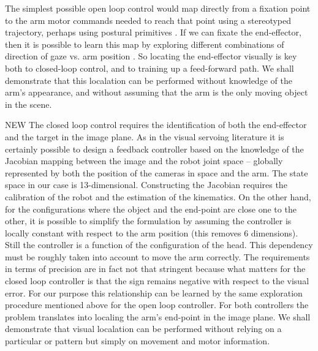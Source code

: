 The simplest possible open loop control would map directly from a
fixation point to the arm motor commands needed to reach that point
\cite{metta99developmental} using a stereotyped trajectory, perhaps
using postural primitives \cite{mussa-ivaldi92vector}.  If we can
fixate the end-effector, then it is possible to learn this map by
exploring different combinations of direction of gaze vs.  arm
position \cite{Marjanovic-96-SAB,metta99developmental}.  So locating
the end-effector visually is key both to closed-loop control, and to
training up a feed-forward path.  We shall demonstrate that this
local\iz{}ation can be performed without knowledge of the arm's appearance,
and without assuming that the arm is the only moving object in the
scene.

\ifverbose
NEW The closed loop control requires the identification of both the
end-effector and the target in the image plane. As in the visual
servoing literature \cite{espiau92new} it is certainly possible to
design a feedback controller based on the knowledge of the Jacobian
mapping between the image and the robot joint space -- globally
represented by both the position of the cameras in space and the arm.
The state space in our case is 13-dimensional. Constructing the
Jacobian requires the calibration of the robot and the estimation of
the kinematics.  On the other hand, for the configurations where the
object and the end-point are close one to the other, it is possible to
simplify the formulation by assuming the controller is locally
constant with respect to the arm position (this removes 6 dimensions).
Still the controller is a function of the configuration of the head.
This dependency must be roughly taken into account to move the arm
correctly. The requirements in terms of precision are in fact not that
stringent because what matters for the closed loop controller is that
the sign remains negative with respect to the visual error. For our
purpose this relationship can be learned by the same exploration
procedure mentioned above for the open loop controller.  For both
controllers the problem translates into local\iz{}ing the arm's end-point
in the image plane. We shall demonstrate that visual local\iz{}ation can
be performed without relying on a particular \ahhcolor{} or pattern but
simply on movement and motor information.
\fi


